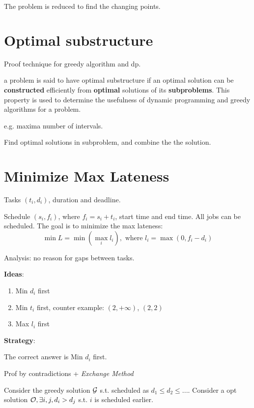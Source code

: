 \documentclass[a4paper]{report}
\begin{document}
The problem is reduced to find the changing points. 

\section{Optimal substructure}
Proof technique for greedy algorithm and dp.

a problem is said to have optimal substructure if an optimal solution can be \textbf{constructed} efficiently from \textbf{optimal} solutions of its \textbf{subproblems}. This property is used to determine the usefulness of dynamic programming and greedy algorithms for a problem.

e.g. maxima number of intervals. 

Find optimal solutions in subproblem, and combine the the solution. 

\section{Minimize Max Lateness}
Tasks $(t_i, d_i)$, duration and deadline. 

Schedule $(s_i, f_i)$, where $f_i=s_i+t_i$, start time and end time. All jobs can be scheduled. The goal is to minimize the max lateness: 
$$
\min L = \min(\max_i l_i), \text{ where } l_i=\max(0, f_i-d_i)
$$

Analysis: no reason for gaps between tasks.

\textbf{Ideas}:
\begin{enumerate}
\item Min $d_i$ first
\item Min $t_i$ first, counter example: $(2, +\infty)$, $(2, 2)$
\item Max $l_i$ first 
\end{enumerate}

\textbf{Strategy}:

The correct answer is Min $d_i$ first. 

Prof by contradictions + \textit{Exchange Method}

Consider the greedy solution $\mathcal{G}$ s.t. scheduled as $d_1 \leq d_2\leq ...$. Consider a opt solution $\mathcal{O}, \exists i,j, d_i > d_j$ s.t. $i$ is scheduled earlier. 
\end{document}
